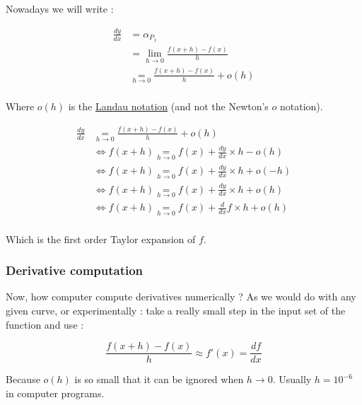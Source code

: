 \documentclass[12pt]{article}
\newcommand\underrel[2]{\mathrel{\mathop{#2}\limits_{#1}}}
\begin{document}
Nowadays we will write :

\begin{equation*}
    \begin{split}
        \frac{dy}{dx} &= \alpha_{P_1} \\
                    &= \lim_{ h \to 0} \frac{f(x + h) - f(x)}{h} \\
                    & \underrel{h \to 0}{=} \frac{f(x + h) - f(x)}{h} + o(h)  \\
    \end{split}
\end{equation*}

Where $o(h)$ is the \href{https://simple.wikipedia.org/wiki/Big_O_notation}{Landau notation} (and not the Newton's $o$ notation).


\begin{equation*}
    \begin{split}
        \frac{dy}{dx} & \underrel{h \to 0}{=} \frac{f(x + h) - f(x)}{h} + o(h)  \\
                    &\Leftrightarrow f(x + h) \underrel{h \to 0}{=}  f(x) + \frac{dy}{dx} \times h - o(h) \\
                    &\Leftrightarrow  f(x + h) \underrel{h \to 0}{=} f(x) + \frac{dy}{dx} \times h + o(-h) \\
                    &\Leftrightarrow  f(x + h) \underrel{h \to 0}{=} f(x) + \frac{dy}{dx} \times h + o(h) \\
                    &\Leftrightarrow  f(x + h) \underrel{h \to 0}{=} f(x) + \frac{d}{dx}f \times h + o(h) \\
    \end{split}
\end{equation*}

Which is the first order Taylor expansion of $f$.


\subsubsection{Derivative computation}


Now, how computer compute derivatives numerically ? As we would do with any given curve, or experimentally : take a really small step in the input set of the function and use :

$$
\frac{f(x+h) - f(x)}{h} \approx f'(x) = \frac{df}{dx}
$$

Because $o(h)$ is so small that it can be ignored when $h \rightarrow 0$. Usually $h=10^{-6}$ in computer programs.
\end{document}
